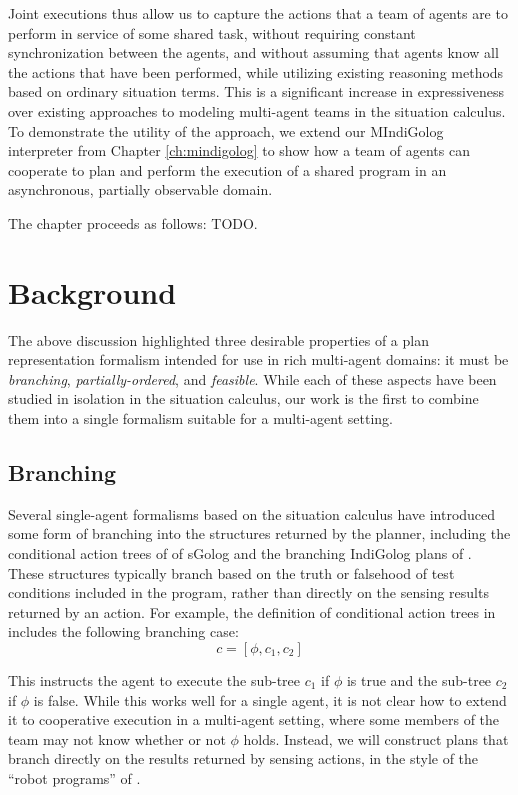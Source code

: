 Joint executions thus allow us to capture the actions that a team
of agents are to perform in service of some shared task, without requiring
constant synchronization between the agents, and without assuming
that agents know all the actions that have been performed, while utilizing
existing reasoning methods based on ordinary situation terms. This
is a significant increase in expressiveness over existing approaches
to modeling multi-agent teams in the situation calculus. To demonstrate
the utility of the approach, we extend our MIndiGolog interpreter
from Chapter \ref{ch:mindigolog} to show how a team of agents can
cooperate to plan and perform the execution of a shared program in
an asynchronous, partially observable domain.

The chapter proceeds as follows: TODO.


\section{Background\label{sec:JointExec:Background}}

The above discussion highlighted three desirable properties of a plan
representation formalism intended for use in rich multi-agent domains:
it must be \emph{branching}, \emph{partially-ordered}, and \emph{feasible}.
While each of these aspects have been studied in isolation in the
situation calculus, our work is the first to combine them into a single
formalism suitable for a multi-agent setting.


\subsection{Branching}

Several single-agent formalisms based on the situation calculus have
introduced some form of branching into the structures returned by
the planner, including the conditional action trees of of sGolog \citep{lakemeyer99golog_cats}
and the branching IndiGolog plans of \citep{giacomo04sem_delib_indigolog}.
These structures typically branch based on the truth or falsehood
of test conditions included in the program, rather than directly on
the sensing results returned by an action. For example, the definition
of conditional action trees in \citep{lakemeyer99golog_cats} includes
the following branching case:\[
c=[\phi,c_{1},c_{2}]\]


This instructs the agent to execute the sub-tree $c_{1}$ if $\phi$
is true and the sub-tree $c_{2}$ if $\phi$ is false. While this
works well for a single agent, it is not clear how to extend it to
cooperative execution in a multi-agent setting, where some members
of the team may not know whether or not $\phi$ holds. Instead, we
will construct plans that branch directly on the results returned
by sensing actions, in the style of the {}``robot programs'' of
\citep{levesque96what_is_planning}.


